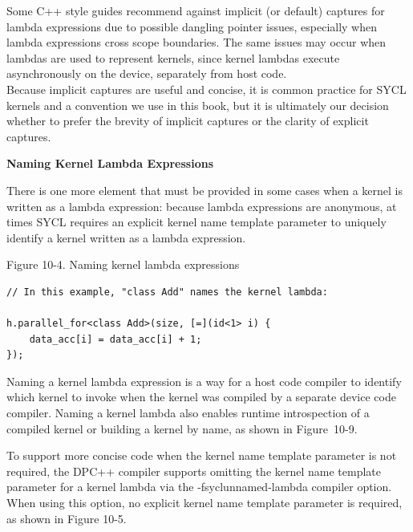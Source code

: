 \begin{tcolorbox}[colback=blue!5!white,colframe=blue!75!black, title=LAMBDA CAPTURES: IMPLICIT OR EXPLICIT?]
Some C++ style guides recommend against implicit (or default) captures for lambda expressions due to possible dangling pointer issues, especially when lambda expressions cross scope boundaries. The same issues may occur when lambdas are used to represent kernels, since kernel lambdas execute asynchronously on the device, separately from host code.\\

Because implicit captures are useful and concise, it is common practice for SYCL kernels and a convention we use in this book, but it is ultimately our decision whether to prefer the brevity of implicit captures or the clarity of explicit captures.
\end{tcolorbox}

\hspace*{\fill} \par %
\textbf{Naming Kernel Lambda Expressions}

There is one more element that must be provided in some cases when a kernel is written as a lambda expression: because lambda expressions are anonymous, at times SYCL requires an explicit kernel name template parameter to uniquely identify a kernel written as a lambda expression.\par

\hspace*{\fill} \par %
Figure 10-4. Naming kernel lambda expressions
\begin{lstlisting}[caption={}]
// In this example, "class Add" names the kernel lambda:

h.parallel_for<class Add>(size, [=](id<1> i) {
	data_acc[i] = data_acc[i] + 1;
});
\end{lstlisting}

Naming a kernel lambda expression is a way for a host code compiler to identify which kernel to invoke when the kernel was compiled by a separate device code compiler. Naming a kernel lambda also enables runtime introspection of a compiled kernel or building a kernel by name, as shown in Figure 10-9.\par

To support more concise code when the kernel name template parameter is not required, the DPC++ compiler supports omitting the kernel name template parameter for a kernel lambda via the -fsyclunnamed-lambda compiler option. When using this option, no explicit kernel name template parameter is required, as shown in Figure 10-5.\par

